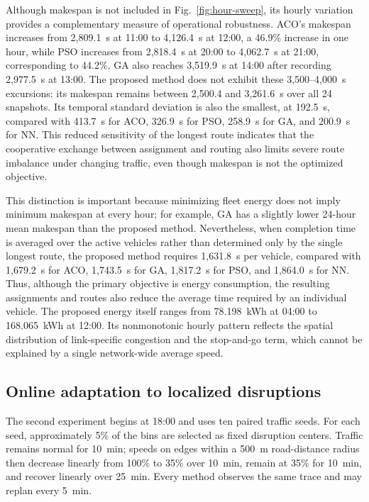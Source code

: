 Although makespan is not included in Fig.~\ref{fig:hour-sweep}, its hourly
variation provides a complementary measure of operational robustness. ACO's
makespan increases from 2,809.1~s at 11:00 to 4,126.4~s at 12:00, a 46.9\%
increase in one hour, while PSO increases from 2,818.4~s at 20:00 to
4,062.7~s at 21:00, corresponding to 44.2\%. GA also reaches 3,519.9~s at
14:00 after recording 2,977.5~s at 13:00. The proposed method does not exhibit
these 3,500--4,000~s excursions: its makespan remains between 2,500.4 and
3,261.6~s over all 24 snapshots. Its temporal standard deviation is also the
smallest, at 192.5~s, compared with 413.7~s for ACO, 326.9~s for PSO,
258.9~s for GA, and 200.9~s for NN. This reduced sensitivity of the longest
route indicates that the cooperative exchange between assignment and routing
also limits severe route imbalance under changing traffic, even though
makespan is not the optimized objective.

This distinction is important because minimizing fleet energy does not imply
minimum makespan at every hour; for example, GA has a slightly lower
24-hour mean makespan than the proposed method. Nevertheless, when completion
time is averaged over the active vehicles rather than determined only by the
single longest route, the proposed method requires 1,631.8~s per vehicle,
compared with 1,679.2~s for ACO, 1,743.5~s for GA, 1,817.2~s for PSO, and
1,864.0~s for NN. Thus, although the primary objective is energy consumption,
the resulting assignments and routes also reduce the average time required by
an individual vehicle. The proposed energy itself ranges from 78.198~kWh at
04:00 to 168.065~kWh at 12:00. Its nonmonotonic hourly pattern reflects the
spatial distribution of link-specific congestion and the stop-and-go term,
which cannot be explained by a single network-wide average speed.

\subsection{Online adaptation to localized disruptions}

The second experiment begins at 18:00 and uses ten paired traffic seeds. For
each seed, approximately 5\% of the bins are selected as fixed disruption
centers. Traffic remains normal for 10~min; speeds on edges within a 500~m
road-distance radius then decrease linearly from 100\% to 35\% over 10~min,
remain at 35\% for 10~min, and recover linearly over 25~min. Every method
observes the same trace and may replan every 5~min.

